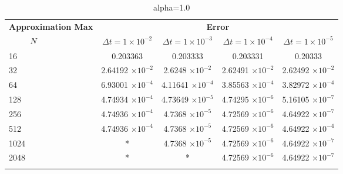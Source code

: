	\begin{table}
	\begin{tabular}{lcccc}
		\toprule
		\multicolumn{1}{c}{\textbf{Approximation Max}} & \multicolumn{4}{c}{\textbf{Error}} \\
		$\hspace{9mm}N$ & $\Delta t=1\times 10^{-2}$ & $\Delta t=1\times 10^{-3}$ & $\Delta t=1\times 10^{-4}$ & $\Delta t=1\times 10^{-5}$ \\
		\midrule
		\hspace{7mm} 16 & 0.203363    & 0.203333    & 0.203331    & 0.20333     \\
		\midrule
		\hspace{7mm} 32 & 2.64192 $\times 10 ^{-2}$   & 2.6248 $\times 10 ^{-2}$    & 2.62491 $\times 10 ^{-2}$  & 2.62492 $\times 10 ^{-2}$   \\
		\midrule
		\hspace{7mm} 64 & 6.93001 $\times 10 ^{-4}$ & 4.11641 $\times 10 ^{-4}$ & 3.85563 $\times 10 ^{-4}$ & 3.82972 $\times 10 ^{-4}$ \\
		\midrule
		\hspace{7mm} 128 & 4.74934 $\times 10 ^{-4}$ & 4.73649 $\times 10 ^{-5}$ & 4.74295 $\times 10 ^{-6}$ & 5.16105 $\times 10 ^{-7}$ \\
		\midrule
		\hspace{7mm} 256 & 4.74936 $\times 10 ^{-4}$ & 4.7368 $\times 10 ^{-5}$  & 4.72569 $\times 10 ^{-6}$ & 4.64922 $\times 10 ^{-7}$ \\
		\midrule
		\hspace{7mm} 512 & 4.74936 $\times 10 ^{-4}$ & 4.7368 $\times 10 ^{-5}$  & 4.72569 $\times 10 ^{-6}$ & 4.64922 $\times 10 ^{-4}$ \\
		\midrule
		\hspace{7mm} 1024 & * & 4.7368 $\times 10 ^{-5}$  & 4.72569 $\times 10 ^{-6}$ & 4.64922 $\times 10 ^{-7}$ \\
		\midrule
		\hspace{7mm} 2048 & * & * & 4.72569 $\times 10 ^{-6}$ & 4.64922 $\times 10 ^{-7}$ \\
		\\
		\bottomrule
	\end{tabular}
	\caption{alpha=1.0}
\end{table}


